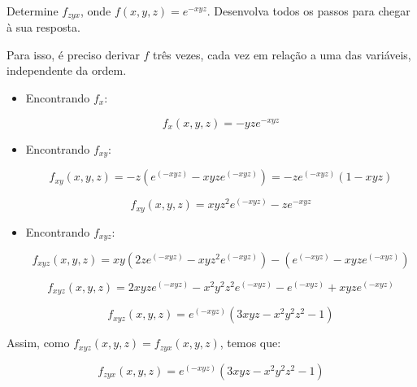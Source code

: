 \\ \\ \\
\item Determine $f_{zyx}$, onde $f(x, y, z) = e^{-xyz}$. Desenvolva
todos os passos para chegar à sua resposta.

\solucao
Para isso, é preciso derivar $f$ três vezes, cada vez em relação
a uma das variáveis, independente da ordem.

\begin{itemize}
	\item Encontrando $f_x$:
	
	$$f_x(x, y, z) = -yze^{-xyz}$$
	
	\item Encontrando $f_{xy}$:
	
	$$f_{xy}(x, y, z) = -z(e^{(-xyz)} - xyze^{(-xyz)}) = -ze^{(-xyz)}(1-xyz)$$
	
	$$f_{xy}(x, y, z) = xyz^2e^{(-xyz)} - ze^{-xyz}$$

	\item Encontrando $f_{xyz}$:
	
	$$f_{xyz}(x, y, z) = xy(2ze^{(-xyz)} - xyz^2e^{(-xyz)}) - (e^{(-xyz)} - xyze^{(-xyz)})$$
	
	$$f_{xyz}(x, y, z) = 2xyze^{(-xyz)} - x^2y^2z^2e^{(-xyz)} - e^{(-xyz)} + xyze^{(-xyz)}$$
	
	$$f_{xyz}(x, y, z) = e^{(-xyz)}(3xyz - x^2y^2z^2 - 1)$$	
\end{itemize}

Assim, como $f_{xyz}(x, y, z) = f_{zyx}(x, y, z)$, temos que:

$$f_{zyx}(x, y, z) = e^{(-xyz)}(3xyz - x^2y^2z^2 - 1)$$	